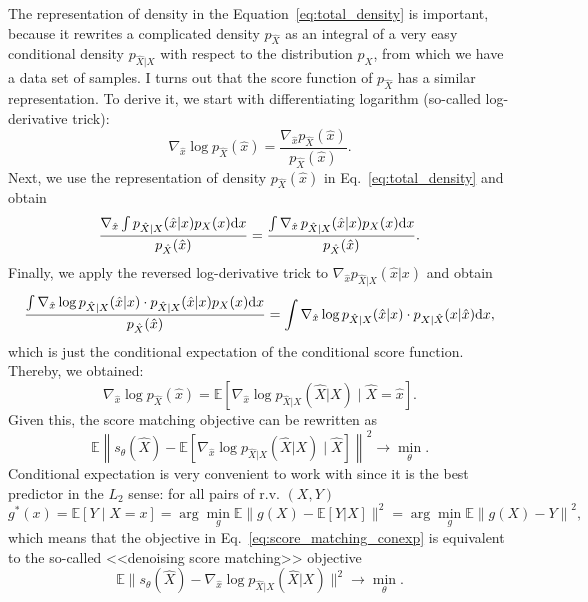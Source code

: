 The representation of density in the Equation~\ref{eq:total_density} is important, because it rewrites a complicated density $p_{\hat{X}}$ as an integral of a very easy conditional density $p_{\hat{X} | X}$ with respect to the distribution $p_X$, from which we have a data set of samples. I turns out that the score function of $p_{\hat{X}}$ has a similar representation. To derive it, we start with differentiating logarithm (so-called log-derivative trick):
\[
    \nabla_{\hat{x}} \log p_{\hat{X}}(\hat{x}) = \frac{\nabla_{\hat{x}} p_{\hat{X}}(\hat{x})}{p_{\hat{X}}(\hat{x})}.
\]
Next, we use the representation of density $p_{\hat{X}}(\hat{x})$ in Eq.~\ref{eq:total_density} and obtain
\[
    \frac{\nabla_{\hat{x}}\int p_{\hat{X} | X}(\hat{x} | x)p_{X}(x) \mathrm{d} x}{p_{\hat{X}}(\hat{x})} = \frac{\int \nabla_{\hat{x}}\,p_{\hat{X} | X}(\hat{x} | x)p_{X}(x) \mathrm{d} x}{p_{\hat{X}}(\hat{x})}.
\]
Finally, we apply the reversed log-derivative trick to $\nabla_{\hat{x}} p_{\hat{X} | X}(\hat{x} | x)$ and obtain
\[
    \frac{\int \nabla_{\hat{x}}\log p_{\hat{X} | X}(\hat{x} | x) \cdot p_{\hat{X} | X}(\hat{x} | x)p_{X}(x) \mathrm{d} x}{p_{\hat{X}}(\hat{x})} = \int \nabla_{\hat{x}}\log p_{\hat{X} | X}(\hat{x} | x) \cdot p_{X | \hat{X}}(x | \hat{x}) \mathrm{d} x,
\]
which is just the conditional expectation of the conditional score function. Thereby, we obtained:
\begin{equation}\label{eq:score_condexp}
    \nabla_{\hat{x}} \log p_{\hat{X}}(\hat{x}) = \mathbb{E}\left[\nabla_{\hat{x}} \log p_{\hat{X} | X}(\hat{X} | X) \mid  \hat{X} = \hat{x}\right].
\end{equation}
Given this, the score matching objective can be rewritten as
\begin{equation}\label{eq:score_matching_conexp}
    \mathbb{E}\left\|s_\theta(\hat{X}) - \mathbb{E}\left[\nabla_{\hat{x}}\log p_{\hat{X} | X}(\hat{X} | X) \mid \hat{X}\right] \right\|^2 \rightarrow \min\limits_{\theta}.
\end{equation}
Conditional expectation is very convenient to work with since it is the best predictor in the $L_2$ sense: for all pairs of r.v. $(X, Y)$
\[
    g^*(x) = \mathbb{E}[Y \mid X = x] = \arg \min\limits_{g} \mathbb{E}\|g(X) - \mathbb{E}\left[Y | X\right] \|^2 = \arg\min\limits_{g} \mathbb{E}\left\|g(X) - Y \right\|^2,
\]
which means that the objective in Eq.~\ref{eq:score_matching_conexp} is equivalent to the so-called <<denoising score matching>> objective
\begin{equation}\label{eq:denoising_score_matching}
    \mathbb{E}\|s_\theta(\hat{X}) - \nabla_{\hat{x}}\log p_{\hat{X} | X}(\hat{X} | X) \|^2 \rightarrow \min\limits_{\theta}.
\end{equation}

